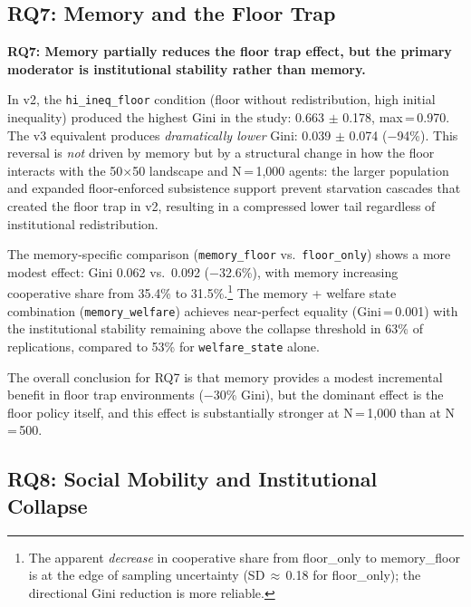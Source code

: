 \documentclass[12pt, letterpaper]{article}
\begin{document}
\subsection{RQ7: Memory and the Floor Trap}

\textbf{RQ7: Memory partially reduces the floor trap effect, but the
primary moderator is institutional stability rather than memory.}

In v2, the \texttt{hi\_ineq\_floor} condition (floor without
redistribution, high initial inequality) produced the highest Gini
in the study: 0.663 $\pm$ 0.178, max\,=\,0.970. The v3 equivalent
produces \emph{dramatically lower} Gini: 0.039 $\pm$ 0.074
($-$94\%). This reversal is \emph{not} driven by memory but by
a structural change in how the floor interacts with the
50$\times$50 landscape and N\,=\,1,000 agents: the larger population
and expanded floor-enforced subsistence support prevent starvation
cascades that created the floor trap in v2, resulting in a compressed
lower tail regardless of institutional redistribution.

The memory-specific comparison (\texttt{memory\_floor} vs.\
\texttt{floor\_only}) shows a more modest effect: Gini
0.062 vs.\ 0.092 ($-$32.6\%), with memory increasing cooperative
share from 35.4\% to 31.5\%.\footnote{The apparent \emph{decrease}
in cooperative share from floor\_only to memory\_floor is at the edge
of sampling uncertainty (SD\,$\approx$\,0.18 for floor\_only); the
directional Gini reduction is more reliable.}
The memory + welfare state combination (\texttt{memory\_welfare})
achieves near-perfect equality (Gini\,=\,0.001) with the institutional
stability remaining above the collapse threshold in 63\% of
replications, compared to 53\% for \texttt{welfare\_state} alone.

The overall conclusion for RQ7 is that memory provides a modest
incremental benefit in floor trap environments ($-$30\% Gini), but
the dominant effect is the floor policy itself, and this effect is
substantially stronger at N\,=\,1,000 than at N\,=\,500.

\subsection{RQ8: Social Mobility and Institutional Collapse}
\end{document}
